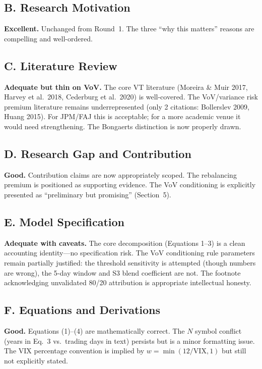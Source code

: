 \documentclass[12pt,a4paper]{article}
\begin{document}
\subsection*{B. Research Motivation}

\textcolor{okgreen}{\textbf{Excellent.}} Unchanged from Round~1. The three ``why this matters'' reasons are compelling and well-ordered.

\subsection*{C. Literature Review}

\textcolor{warncolor}{\textbf{Adequate but thin on VoV.}} The core VT literature (Moreira \& Muir 2017, Harvey et al.\ 2018, Cederburg et al.\ 2020) is well-covered. The VoV/variance risk premium literature remains underrepresented (only 2 citations: Bollerslev 2009, Huang 2015). For JPM/FAJ this is acceptable; for a more academic venue it would need strengthening. The Bongaerts distinction is now properly drawn.

\subsection*{D. Research Gap and Contribution}

\textcolor{okgreen}{\textbf{Good.}} Contribution claims are now appropriately scoped. The rebalancing premium is positioned as supporting evidence. The VoV conditioning is explicitly presented as ``preliminary but promising'' (Section~5).

\subsection*{E. Model Specification}

\textcolor{warncolor}{\textbf{Adequate with caveats.}} The core decomposition (Equations 1--3) is a clean accounting identity---no specification risk. The VoV conditioning rule parameters remain partially justified: the threshold sensitivity is attempted (though numbers are wrong), the 5-day window and S3 blend coefficient are not. The footnote acknowledging unvalidated 80/20 attribution is appropriate intellectual honesty.

\subsection*{F. Equations and Derivations}

\textcolor{okgreen}{\textbf{Good.}} Equations (1)--(4) are mathematically correct. The $N$ symbol conflict (years in Eq.~3 vs.\ trading days in text) persists but is a minor formatting issue. The VIX percentage convention is implied by $w = \min(12/\text{VIX}, 1)$ but still not explicitly stated.
\end{document}
